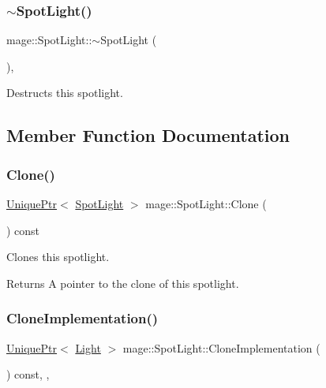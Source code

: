 \subsubsection{\texorpdfstring{$\sim$\+Spot\+Light()}{~SpotLight()}}
{\footnotesize\ttfamily mage\+::\+Spot\+Light\+::$\sim$\+Spot\+Light (\begin{DoxyParamCaption}{ }\end{DoxyParamCaption})\hspace{0.3cm}{\ttfamily [virtual]}, {\ttfamily [default]}}

Destructs this spotlight. 

\subsection{Member Function Documentation}
\hypertarget{classmage_1_1_spot_light_a1092a1238be8cfd771a43e6976d16270}{}\label{classmage_1_1_spot_light_a1092a1238be8cfd771a43e6976d16270} 
\subsubsection{\texorpdfstring{Clone()}{Clone()}}
{\footnotesize\ttfamily \hyperlink{namespacemage_a3316d7143a973e37adf1110f2e80ca31}{Unique\+Ptr}$<$ \hyperlink{classmage_1_1_spot_light}{Spot\+Light} $>$ mage\+::\+Spot\+Light\+::\+Clone (\begin{DoxyParamCaption}{ }\end{DoxyParamCaption}) const}

Clones this spotlight.

\begin{DoxyReturn}{Returns}
A pointer to the clone of this spotlight. 
\end{DoxyReturn}
\hypertarget{classmage_1_1_spot_light_a060044ae1de97143878ad26524f03709}{}\label{classmage_1_1_spot_light_a060044ae1de97143878ad26524f03709} 
\subsubsection{\texorpdfstring{Clone\+Implementation()}{CloneImplementation()}}
{\footnotesize\ttfamily \hyperlink{namespacemage_a3316d7143a973e37adf1110f2e80ca31}{Unique\+Ptr}$<$ \hyperlink{classmage_1_1_light}{Light} $>$ mage\+::\+Spot\+Light\+::\+Clone\+Implementation (\begin{DoxyParamCaption}{ }\end{DoxyParamCaption}) const\hspace{0.3cm}{\ttfamily [override]}, {\ttfamily [private]}, {\ttfamily [virtual]}}

